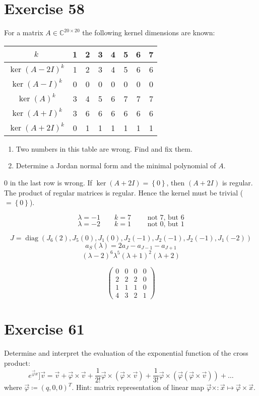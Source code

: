 \documentclass[a4paper]{article}
\theoremstyle{definition}
\newcommand\set[1]{\left\{#1\right\}}
\begin{document}
\section*{Exercise 58}
\begin{ex}
  For a matrix $A \in \mathbb C^{20 \times 20}$ the following kernel dimensions are known:

  \begin{center}
    \begin{tabular}{c|ccccccc}
      $k$ & 1 & 2 & 3 & 4 & 5 & 6 & 7 \\
    \hline
      $\ker(A - 2I)^k$ & 1 & 2 & 3 & 4 & 5 & 6 & 6 \\
      $\ker(A - I)^k$  & 0 & 0 & 0 & 0 & 0 & 0 & 0 \\
      $\ker(A)^k$      & 3 & 4 & 5 & 6 & 7 & 7 & 7 \\
      $\ker(A + I)^k$  & 3 & 6 & 6 & 6 & 6 & 6 & 6 \\
      $\ker(A + 2I)^k$ & 0 & 1 & 1 & 1 & 1 & 1 & 1
    \end{tabular}
  \end{center}

  \begin{enumerate}
    \item Two numbers in this table are wrong. Find and fix them.
    \item Determine a Jordan normal form and the minimal polynomial of $A$.
  \end{enumerate}
\end{ex}

$0$ in the last row is wrong. If $\ker(A + 2I) = \set{0}$, then $(A + 2I)$ is regular. The product of regular matrices is regular. Hence the kernel must be trivial ($= \set{0}$).

\[ \lambda = -1 \qquad k = 7 \qquad \text{ not 7, but 6} \]
\[ \lambda = -2 \qquad k = 1 \qquad \text{ not 0, but 1} \]

\[ J = \operatorname{diag}(J_6(2), J_5(0), J_1(0), J_2(-1), J_2(-1), J_2(-1), J_1(-2)) \]
\[ a_S(\lambda) = 2a_J - a_{J-1} - a_{J+1} \]
\[ (\lambda - 2)^6 \lambda^5 (\lambda + 1)^2 (\lambda + 2) \]

\[
  \begin{pmatrix}
    0 & 0 & 0 & 0 \\
    2 & 2 & 2 & 0 \\
    1 & 1 & 1 & 0 \\
    4 & 3 & 2 & 1
  \end{pmatrix}
\]

\section*{Exercise 61}
\begin{ex}
  Determine and interpret the evaluation of the exponential function of the cross product:
  \[ e^{\vec \varphi x}] \vec v = \vec v + \vec \varphi \times \vec v + \frac1{2!} \vec\varphi \times (\vec \varphi \times \vec v) + \frac1{3!} \vec\varphi \times (\vec \varphi (\vec \varphi \times \vec v)) + \dots \]
  where $\vec\varphi \coloneqq (q, 0, 0)^T$. Hint: matrix representation of linear map $\vec\varphi \times: \vec x \mapsto \vec \varphi \times \vec x$.
\end{ex}
\end{document}
